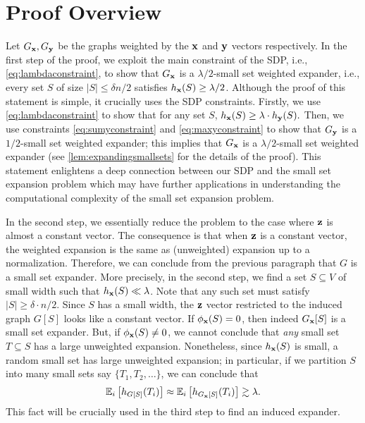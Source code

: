 \documentclass[11pt]{article}
\def\bx{{\bf x}}
\def\by{{\bf y}}
\def\bz{{\bf z}}
\def\mE{\mathbb{E}}
\newcommand{\EE}[2]{\mE_{#1}\left[#2\right]}
\def\h{h}
\begin{document}
\section{Proof Overview}\label{sec:proofoverview}
Let $G_\bx,G_\by$ be the graphs weighted by the $\bx$ and $\by$ vectors respectively. In the first step of the proof, we exploit the main constraint of the SDP, i.e., \eqref{eq:lambdaconstraint}, to show that $G_\bx$ is a $\lambda/2$-small set  weighted expander, i.e., every set $S$ of size  $|S|\leq \delta n/2$ satisfies $\h_\bx(S) \geq \lambda/2$.
Although the proof of this statement is simple, it crucially uses the SDP constraints.
Firstly, we use \eqref{eq:lambdaconstraint} to show that for any set $S$, $ \h_\bx(S) \geq \lambda\cdot  \h_\by(S).$ Then, we use constraints \eqref{eq:sumyconstraint} and \eqref{eq:maxyconstraint} to show that $G_\by$ is a $1/2$-small set  weighted expander; this implies that $G_\bx$ is a $\lambda/2$-small set weighted expander (see \autoref{lem:expandingsmallsets} for the details of the proof). 
This statement  enlightens  a deep connection between our SDP and the small set expansion problem which may have further applications in understanding the computational complexity of the small set expansion problem. 

In the second step, we  essentially reduce the problem to the case where $\bz$ is almost a constant vector. 
The consequence is that when $\bz$ is a constant vector,  the weighted expansion is the same as (unweighted) expansion up to a normalization. Therefore,  we can conclude from the previous paragraph that $G$ is a small set expander.
More precisely, in the second step, we find a set $S\subseteq V$ of small width such that $\h_\bx(S)\ll \lambda$. Note that any such set must satisfy $|S|\geq \delta\cdot n/2$. Since $S$ has a small width, the $\bz$ vector restricted to the induced graph $G[S]$ looks like a constant vector. 
If $\phi_\bx(S)=0$, then indeed $G_\bx[S]$ is a small set expander. 
But, if $\phi_\bx(S)\neq 0$, we cannot conclude that \emph{any} small set $T\subseteq S$ has a large unweighted expansion. 
Nonetheless, since $\h_\bx(S)$ is small, a random small set has large unweighted expansion; in particular, if we partition $S$ into many small sets say $\{T_1,T_2,\dots\}$, we can conclude that 
\begin{equation}\label{eq:hGxbigTi} \EE{i}{\h_{G[S]}(T_i)}\approx \EE{i}{\h_{G_\bx[S]}(T_i)} \gtrsim \lambda.	
\end{equation}
This fact will be crucially used in the third step to find an induced expander.
\end{document}
